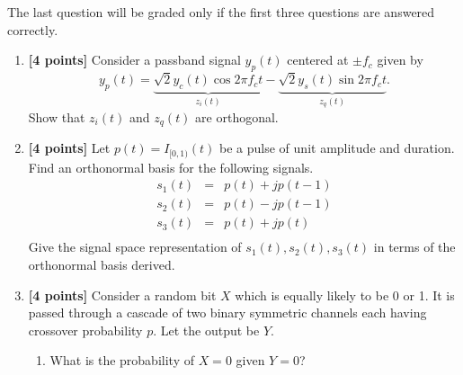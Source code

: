 \documentclass[10pt]{report}
\begin{document}
The last question will be graded only if the first three questions are answered correctly.
\begin{enumerate}
  \item \textbf{[4 points]} Consider a passband signal $y_p(t)$ centered at $\pm f_c$ given by
    \begin{equation*}
      y_p(t) = \underbrace{\sqrt{2}y_c(t)\cos 2\pi f_c t}_{z_i(t)} - \underbrace{\sqrt{2}y_s(t)\sin 2\pi f_c t}_{z_q(t)}.
    \end{equation*}
  Show that $z_i(t)$ and $z_q(t)$ are orthogonal.
  \item \textbf{[4 points]} Let $p(t) = I_{[0,1)}(t)$ be a pulse of unit amplitude and duration. Find an orthonormal basis for the following signals.
    \begin{eqnarray*}
      s_1(t) & = & p(t) + jp(t-1) \\
      s_2(t) & = & p(t) - jp(t-1) \\
      s_3(t) & = & p(t) + jp(t) \\
    \end{eqnarray*}
    Give the signal space representation of $s_1(t), s_2(t), s_3(t)$ in terms of the orthonormal basis derived.
    \begin{figure}[h]
      \centering
    \end{figure}
  \item \textbf{[4 points]} Consider a random bit $X$ which is equally likely to be 0 or 1. It is passed through a cascade of two binary symmetric channels each having crossover probability $p$. Let the output be $Y$. 
    \begin{enumerate}
      \item What is the probability of $X = 0$ given $Y = 0$?

\end{enumerate}
\end{enumerate}
\end{document}
